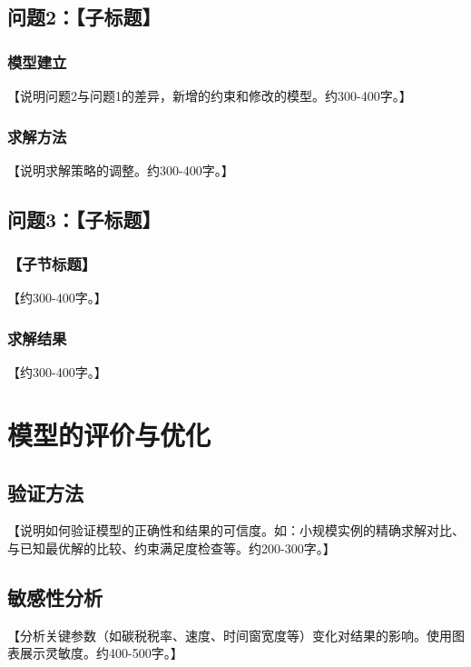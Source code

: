\documentclass[12pt,letterpaper]{ctexart}
\numberwithin{equation}{section}
\numberwithin{figure}{section}
\numberwithin{table}{section}
\begin{document}
\subsection{问题2：【子标题】}

\subsubsection{模型建立}
【说明问题2与问题1的差异，新增的约束和修改的模型。约300-400字。】

\subsubsection{求解方法}
【说明求解策略的调整。约300-400字。】

\subsection{问题3：【子标题】}

\subsubsection{【子节标题】}
【约300-400字。】

\subsubsection{求解结果}
【约300-400字。】

\section{模型的评价与优化}

\subsection{验证方法}
【说明如何验证模型的正确性和结果的可信度。如：小规模实例的精确求解对比、与已知最优解的比较、约束满足度检查等。约200-300字。】

\subsection{敏感性分析}
【分析关键参数（如碳税税率、速度、时间窗宽度等）变化对结果的影响。使用图表展示灵敏度。约400-500字。】

\end{document}
